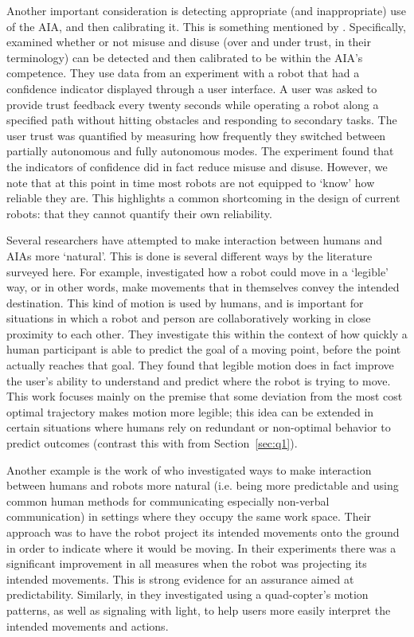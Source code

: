 Another important consideration is detecting appropriate (and inappropriate) use of the AIA, and then calibrating it. This is something mentioned by \cite{Muir1994-ow,Kaniarasu2013-ho}. Specifically, \citet{Kaniarasu2013-ho} examined whether or not misuse and disuse (over and under trust, in their terminology) can be detected and then calibrated to be within the AIA's competence. They use data from an experiment with a robot that had a confidence indicator displayed through a user interface. A user was asked to provide trust feedback every twenty seconds while operating a robot along a specified path without hitting obstacles and responding to secondary tasks. The user trust was quantified by measuring how frequently they switched between partially autonomous and fully autonomous modes. The experiment found that the indicators of confidence did in fact reduce misuse and disuse. However, we note that at this point in time most robots are not equipped to `know' how reliable they are. This highlights a common shortcoming in the design of current robots: that they cannot quantify their own reliability.

Several researchers have attempted to make interaction between humans and AIAs more `natural'. This is done is several different ways by the literature surveyed here. For example, \citet{Dragan2013-wd} investigated how a robot could move in a `legible' way, or in other words, make movements that in themselves convey the intended destination. This kind of motion is used by humans, and is important for situations in which a robot and person are collaboratively working in close proximity to each other. They investigate this within the context of how quickly a human participant is able to predict the goal of a moving point, before the point actually reaches that goal. They found that legible motion does in fact improve the user's ability to understand and predict where the robot is trying to move. This work focuses mainly on the premise that some deviation from the most cost optimal trajectory makes motion more legible; this idea can be extended in certain situations where humans rely on redundant or non-optimal behavior to predict outcomes (contrast this with \citet{Wu2016-ei} from Section~\ref{sec:q1}).

Another example is the work of \citet{Chadalavada2015-wx} who investigated ways to make interaction between humans and robots more natural (i.e. being more predictable and using common human methods for communicating especially non-verbal communication) in settings where they occupy the same work space. Their approach was to have the robot project its intended movements onto the ground in order to indicate where it would be moving. In their experiments there was a significant improvement in all measures when the robot was projecting its intended movements. This is strong evidence for an assurance aimed at predictability. Similarly, in \citet{Szafir2014-ok,Szafir2015-iy} they investigated using a quad-copter's motion patterns, as well as signaling with light, to help users more easily interpret the intended movements and actions.

